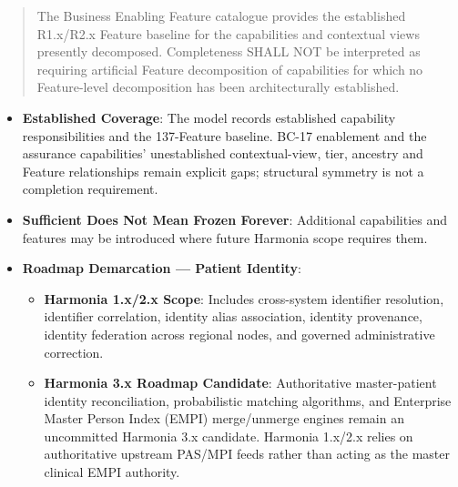 \begin{quote}

The Business Enabling Feature catalogue provides the established R1.x/\allowbreak{}R2.x Feature baseline for the capabilities and contextual views presently decomposed. Completeness SHALL NOT be interpreted as requiring artificial Feature decomposition of capabilities for which no Feature-level decomposition has been architecturally established.


\end{quote}
\label{rad:enabling:63}

\begin{itemize}

\item
\textbf{Established Coverage}: The model records established capability responsibilities and the 137-Feature baseline. BC-17 enablement and the assurance capabilities' unestablished contextual-view, tier, ancestry and Feature relationships remain explicit gaps; structural symmetry is not a completion requirement.



\item
\textbf{Sufficient Does Not Mean Frozen Forever}: Additional capabilities and features may be introduced where future Harmonia scope requires them.



\item
\textbf{Roadmap Demarcation — Patient Identity}:


\begin{itemize}

\item
\textbf{Harmonia 1.x/\allowbreak{}2.x Scope}: Includes cross-system identifier resolution, identifier correlation, identity alias association, identity provenance, identity federation across regional nodes, and governed administrative correction.



\item
\textbf{Harmonia 3.x Roadmap Candidate}: Authoritative master-patient identity reconciliation, probabilistic matching algorithms, and Enterprise Master Person Index (EMPI) merge/\allowbreak{}unmerge engines remain an uncommitted Harmonia 3.x candidate. Harmonia 1.x/\allowbreak{}2.x relies on authoritative upstream PAS/\allowbreak{}MPI feeds rather than acting as the master clinical EMPI authority.



\end{itemize}


\end{itemize}
\label{rad:enabling:69}

